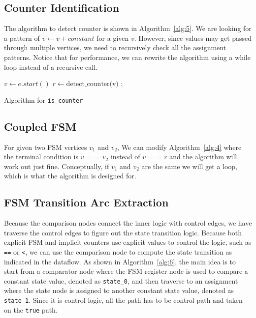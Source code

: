 \documentclass{article}
\begin{document}
\subsection{Counter Identification}
The algorithm to detect counter is shown in Algorithm~\ref{alg:5}. We are looking for a pattern of
$v \gets v + constant$ for a given $v$. However, since values may get passed through multiple
vertices, we need to recursively check all the assignment patterns. Notice that for performance,
we can rewrite the algorithm using a while loop instead of a recursive call.

\begin{algorithm}[htb]
    \label{alg:5}
     {
        $v \gets e.start()$\;
         {
             {
                \;
            }
        }
        $r \gets \text{detect\_counter(v)}$\;
         {
            ;
        }
    }
    \;
 \caption{Algorithm for \texttt{is\_counter}}
\end{algorithm}

\subsection{Coupled FSM}
For given two FSM vertices $v_1$ and $v_2$, We can modify Algorithm~\ref{alg:4} where the
terminal condition is $v == v_2$ instead of $v == r$ and the algorithm will work out just
fine. Conceptually, if $v_1$ and $v_2$ are the same we will get a loop, which is what the
algorithm is designed for.

\subsection{FSM Transition Arc Extraction}
Because the comparison nodes connect the inner logic with control edges, we have traverse
the control edges to figure out the state transition logic. Because both explicit FSM and
implicit counters use explicit values to control the logic, such as \texttt{==} or \texttt{<},
we can use the comparison node to compute the state transition as indicated in the dataflow.
As shown in Algorithm~\ref{alg:6}, the main idea is to start from a comparator node where the
FSM register node is used to compare a constant state value, denoted as \texttt{state\_0},
and then traverse to an assignment where the state node is assigned to another constant state
value, denoted as \texttt{state\_1}. Since it is control logic, all the path has to be control
path and taken on the \texttt{true} path.
\end{document}
